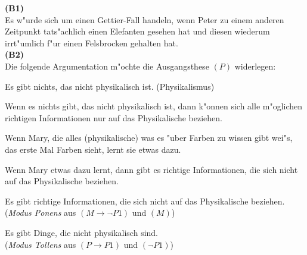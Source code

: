 \documentclass[a4paper]{article}
\begin{document}
\noindent\textbf{(B1)}\\
\noindent Es w"urde sich um einen Gettier-Fall handeln, wenn Peter zu einem anderen Zeitpunkt tats"achlich einen Elefanten gesehen hat und diesen wiederum irrt"umlich f"ur einen Felsbrocken gehalten hat.\\

\noindent\textbf{(B2)}\\
\noindent Die folgende Argumentation m"ochte die Ausgangsthese $(P)$ widerlegen:

\begin{description}[leftmargin=!,labelwidth=\widthof{\bfseries (M $\rightarrow \neg$P1)}]
  \item[(P)] Es gibt nichts, das nicht physikalisch ist. (Physikalismus)
  \item[(P $\rightarrow$ P1)] Wenn es nichts gibt, das nicht physikalisch ist, dann k"onnen sich alle m"oglichen richtigen Informationen nur auf das Physikalische beziehen.
  \item[(M)] Wenn Mary, die alles (physikalische) was es "uber Farben zu wissen gibt wei"s, das erste Mal Farben sieht, lernt sie etwas dazu.
  \item[(M $\rightarrow \neg$P1)] Wenn Mary etwas dazu lernt, dann gibt es richtige Informationen, die sich nicht auf das Physikalische beziehen.
  \item[($\neg$P1)] Es gibt richtige Informationen, die sich nicht auf das Physikalische beziehen.\\ (\emph{Modus Ponens} aus $(M \rightarrow \neg P1)$ und $(M)$)
  \item[(K)] Es gibt Dinge, die nicht physikalisch sind.\\ (\emph{Modus Tollens} aus $(P \rightarrow P1)$ und $(\neg P1)$)
\end{description}

\end{document}
